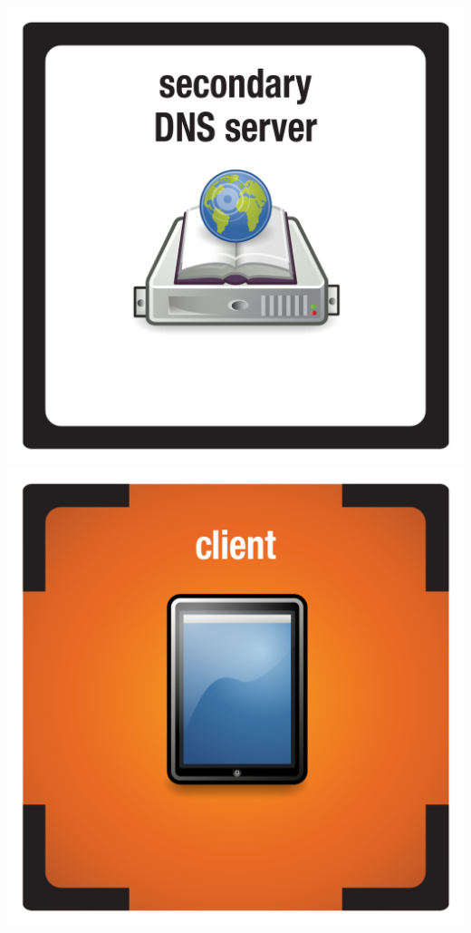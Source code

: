 \documentclass{letter}
\begin{document}
\includegraphics{tiles/node_secondary_dns}
\includegraphics{tiles/node_client_tablet_compromised} \\
\end{document}
